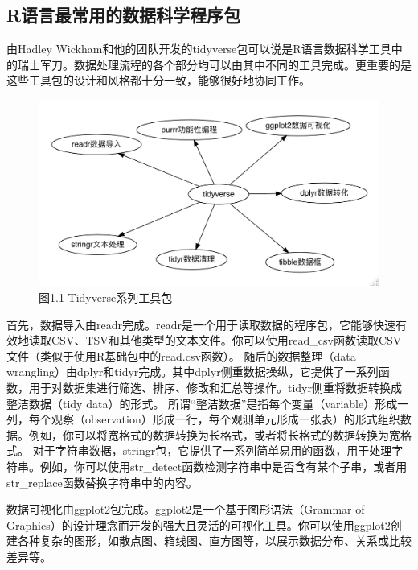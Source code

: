 \documentclass[]{book}
\begin{document}
\hypertarget{rux8bedux8a00ux6700ux5e38ux7528ux7684ux6570ux636eux79d1ux5b66ux7a0bux5e8fux5305}{%
\subsection{R语言最常用的数据科学程序包}\label{rux8bedux8a00ux6700ux5e38ux7528ux7684ux6570ux636eux79d1ux5b66ux7a0bux5e8fux5305}}

由Hadley Wickham和他的团队开发的tidyverse包可以说是R语言数据科学工具中的瑞士军刀。数据处理流程的各个部分均可以由其中不同的工具完成。更重要的是这些工具包的设计和风格都十分一致，能够很好地协同工作。

\begin{figure}
\centering
\includegraphics{images/fig3.1.png}
\caption{图1.1 Tidyverse系列工具包}
\end{figure}

首先，数据导入由readr完成。readr是一个用于读取数据的程序包，它能够快速有效地读取CSV、TSV和其他类型的文本文件。你可以使用read\_csv函数读取CSV文件（类似于使用R基础包中的read.csv函数）。
随后的数据整理（data wrangling）由dplyr和tidyr完成。其中dplyr侧重数据操纵，它提供了一系列函数，用于对数据集进行筛选、排序、修改和汇总等操作。tidyr侧重将数据转换成整洁数据（tidy data）的形式。
所谓``整洁数据''是指每个变量（variable）形成一列，每个观察（observation）形成一行，每个观测单元形成一张表）的形式组织数据。例如，你可以将宽格式的数据转换为长格式，或者将长格式的数据转换为宽格式。
对于字符串数据，stringr包，它提供了一系列简单易用的函数，用于处理字符串。例如，你可以使用str\_detect函数检测字符串中是否含有某个子串，或者用str\_replace函数替换字符串中的内容。

数据可视化由ggplot2包完成。ggplot2是一个基于图形语法（Grammar of Graphics）的设计理念而开发的强大且灵活的可视化工具。你可以使用ggplot2创建各种复杂的图形，如散点图、箱线图、直方图等，以展示数据分布、关系或比较差异等。
\end{document}
